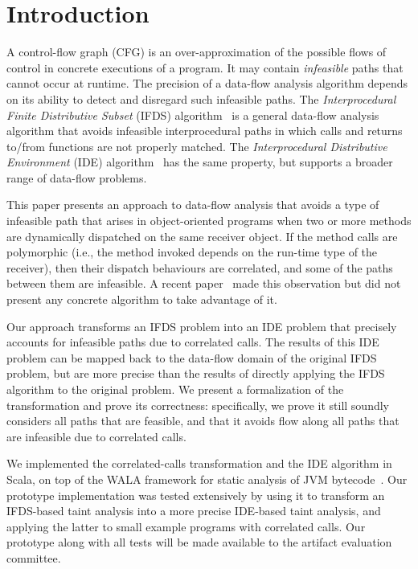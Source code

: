 \section{Introduction}

A control-flow graph (CFG) is an over-approximation of the possible flows 
of control in concrete executions of a program. It may contain \textit{infeasible} 
paths that cannot occur at runtime. The precision of a data-flow analysis algorithm
depends on its ability to detect and disregard such infeasible paths.
The \textit{Interprocedural Finite Distributive Subset} (IFDS) algorithm~\cite{reps1995precise}
is a general data-flow analysis algorithm that 
avoids infeasible interprocedural paths in which calls 
and returns to/from functions are not properly matched. 
The \textit{Interprocedural Distributive Environment} (IDE) algorithm~\cite{sagiv1996precise}
has the same property, but
supports a broader range of data-flow problems.

This paper presents an approach to data-flow analysis that avoids a type
of infeasible path that arises in object-oriented programs when two or more
methods are dynamically dispatched on the same receiver object.
If the
method calls are polymorphic
(i.e., the method invoked depends on the run-time type of the receiver),
then their dispatch 
behaviours are correlated, and some of the paths between them are infeasible. A recent paper~\cite{DBLP:journals/scp/Tip15} made this observation
but did not present any concrete algorithm to take advantage of it.


Our approach transforms an IFDS problem into an
IDE problem that precisely accounts for infeasible paths due to correlated calls. 
The results of this IDE problem can be mapped back to the data-flow domain of the 
original IFDS problem, but are more precise than the results of directly applying
the IFDS algorithm to the original problem.
We present a formalization of the transformation and prove its correctness:
specifically, we prove it still soundly considers all paths that are feasible,
and that it avoids flow along all paths that are infeasible due to
correlated calls.

We implemented the correlated-calls transformation and the IDE algorithm in Scala,
on top of the WALA framework for static analysis of JVM bytecode~\cite{fink2012wala}.
Our prototype implementation was tested extensively by using it to transform an IFDS-based 
taint analysis into a more precise IDE-based taint analysis, and applying the latter
to small example programs with correlated calls. Our prototype along with all tests
will be made available to the artifact evaluation committee.


